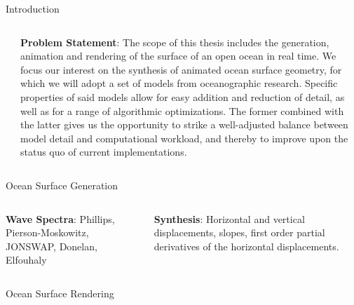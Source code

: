 \documentclass[final,hyperref={pdfpagelabels=true}]{beamer}
\begin{document}
\begin{frame}
\begin{center}
\begin{minipage}{\textwidth}
\begin{block}{Introduction}
\begin{columns}[t]
\begin{column}{0.45\linewidth}
				\end{column}
				\begin{column}{0.45\linewidth}
					\textbf{Problem Statement}:
					The scope of this thesis includes the generation, animation and rendering of the
					surface of an open ocean in real time. We focus our interest on the synthesis of
					animated ocean surface geometry, for which we will adopt a set of models from
					oceanographic research. Specific properties of said models allow for
					easy addition and reduction of detail, as well as for a range of algorithmic
					optimizations. The former combined with the latter gives us the opportunity to
					strike a well-adjusted balance between model detail and computational workload,
					and thereby to improve upon the status quo of current implementations.
				\end{column}	  
			\end{columns}
		\end{block}
	\end{minipage}
	\begin{minipage}{\textwidth}
		\begin{block}{Ocean Surface Generation}	
			\begin{columns}[t]
				\begin{column}{0.45\linewidth}
					\textbf{Wave Spectra}:
					Phillips, Pierson-Moskowitz, JONSWAP, Donelan, Elfouhaly
				\end{column}
				\begin{column}{0.45\linewidth}
					\textbf{Synthesis}:
					Horizontal and vertical displacements, slopes, first order partial derivatives of the horizontal displacements.
				\end{column}	  
			\end{columns}
		\end{block}
	\end{minipage}
	\begin{minipage}{\textwidth}
		\begin{block}{Ocean Surface Rendering}
			\begin{columns}[t]
				\begin{column}{\linewidth}
				    \begin{figure}
					\centering

\end{figure}
\end{column}
\end{columns}
\end{block}
\end{minipage}
\end{center}
\end{frame}
\end{document}
